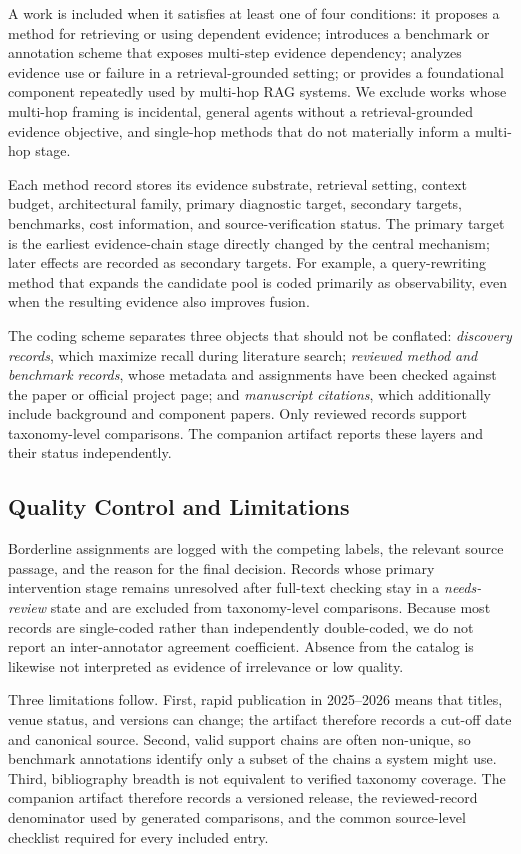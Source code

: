 \documentclass[manuscript,review]{acmart}
\theoremstyle{definition}
\theoremstyle{plain}
\theoremstyle{remark}
\begin{document}
A work is included when it satisfies at least one of four conditions: it
proposes a method for retrieving or using dependent evidence; introduces a
benchmark or annotation scheme that exposes multi-step evidence dependency;
analyzes evidence use or failure in a retrieval-grounded setting; or provides
a foundational component repeatedly used by multi-hop RAG systems. We exclude
works whose multi-hop framing is incidental, general agents without a
retrieval-grounded evidence objective, and single-hop methods that do not
materially inform a multi-hop stage.

Each method record stores its evidence substrate, retrieval setting, context
budget, architectural family, primary diagnostic target, secondary targets,
benchmarks, cost information, and source-verification status. The primary
target is the earliest evidence-chain stage directly changed by the central
mechanism; later effects are recorded as secondary targets. For example, a
query-rewriting method that expands the candidate pool is coded primarily as
observability, even when the resulting evidence also improves fusion.

The coding scheme separates three objects that should not be conflated:
\emph{discovery records}, which maximize recall during literature search;
\emph{reviewed method and benchmark records}, whose metadata and assignments
have been checked against the paper or official project page; and
\emph{manuscript citations}, which additionally include background and
component papers. Only reviewed records support taxonomy-level comparisons.
The companion artifact reports these layers and their status independently.

\subsection{Quality Control and Limitations}

Borderline assignments are logged with the competing labels, the relevant
source passage, and the reason for the final decision. Records whose primary
intervention stage remains unresolved after full-text checking stay in a
\emph{needs-review} state and are excluded from taxonomy-level comparisons.
Because most records are single-coded rather than independently double-coded,
we do not report an inter-annotator agreement coefficient. Absence from the
catalog is likewise not interpreted as evidence of irrelevance or low
quality.

Three limitations follow. First, rapid publication in 2025--2026 means that
titles, venue status, and versions can change; the artifact therefore records
a cut-off date and canonical source. Second, valid support chains are often
non-unique, so benchmark annotations identify only a subset of the chains a
system might use. Third, bibliography breadth is not equivalent to verified
taxonomy coverage. The companion artifact therefore records a versioned
release, the reviewed-record denominator used by generated comparisons, and
the common source-level checklist required for every included entry.
\end{document}
